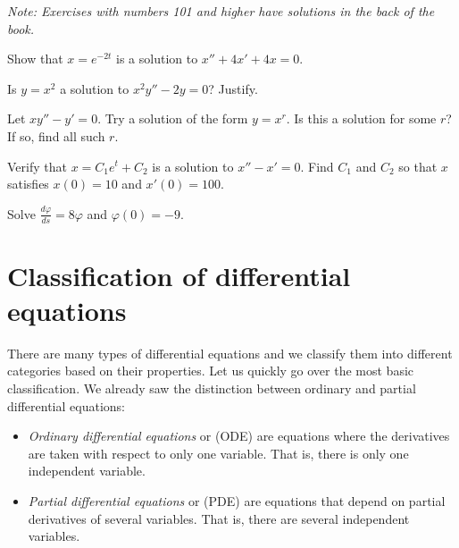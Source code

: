 \noindent
\emph{Note: Exercises with numbers 101 and higher have solutions in the
back of the book.}


\setcounter{exercise}{100}

\begin{exercise}
Show that $x = e^{-2t}$ is a solution to $x'' + 4x' + 4x = 0$.
\end{exercise}

\begin{exercise}
Is $y = x^2$ a solution to $x^2y'' - 2y = 0$?  Justify.
\end{exercise}

\begin{exercise}
Let $xy'' - y' = 0$.  Try a solution of the form $y = x^r$.  Is this a
solution for some $r$?  If so, find all such $r$.
\end{exercise}


\begin{exercise}
Verify that $x=C_1e^t+C_2$ is a solution to $x''-x' = 0$.  Find $C_1$ and
$C_2$ so that $x$ satisfies $x(0) = 10$ and $x'(0) = 100$.
\end{exercise}

\begin{exercise}
Solve $\frac{d\varphi}{ds} = 8 \varphi$ and $\varphi(0) = -9$.
\end{exercise}


\sectionnewpage
\section{Classification of differential equations}
\label{classification:section}


There are many types of differential equations and we classify them into
different categories based on their properties.  Let us quickly go over
the most basic classification.  We already saw the distinction
between ordinary and partial differential equations:
\begin{itemize}
\item
\emph{Ordinary differential equations}
 or (ODE) are
equations where the derivatives are taken with respect to only one variable.
That is, there is only one independent variable.
\item
\emph{Partial differential equations}
 or (PDE) are
equations that depend on partial derivatives of several variables.
That is, there are several independent variables.
\end{itemize}

